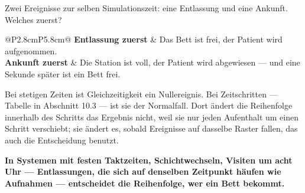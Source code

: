 \begin{warnung}
Zwei Ereignisse zur selben Simulationszeit: eine Entlassung und eine Ankunft. Welches zuerst?

\begin{center}
{\small
\renewcommand{\arraystretch}{1.5}
\begin{tabular}{@{}P{2.8cm}P{5.8cm}@{}}
\toprule
\textbf{Entlassung zuerst} & Das Bett ist frei, der Patient wird aufgenommen.\\
\textbf{Ankunft zuerst} & Die Station ist voll, der Patient wird abgewiesen --- und eine Sekunde später ist ein Bett frei.\\
\bottomrule
\end{tabular}}
\end{center}

Bei stetigen Zeiten ist Gleichzeitigkeit ein Nullereignis. Bei Zeitschritten --- Tabelle in Abschnitt 10.3 --- ist sie der Normalfall. Dort ändert die Reihenfolge innerhalb des Schritts das Ergebnis nicht, weil sie nur jeden Aufenthalt um einen Schritt verschiebt; sie ändert es, sobald Ereignisse auf dasselbe Raster fallen, das auch die Entscheidung benutzt.

\begin{center}
\begin{minipage}{0.9\textwidth}
\textbf{In Systemen mit festen Taktzeiten, Schichtwechseln, Visiten um acht Uhr --- Entlassungen, die sich auf denselben Zeitpunkt häufen wie Aufnahmen --- entscheidet die Reihenfolge, wer ein Bett bekommt.}
\end{minipage}
\end{center}

\begin{center}
\begin{minipage}{0.88\textwidth}
\end{minipage}
\end{center}
\end{warnung}

